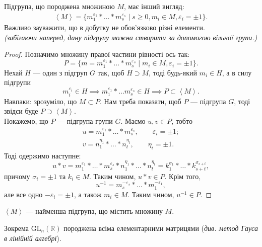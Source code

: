 \documentclass{math_library}
\begin{document}
\begin{proposition}
Підгрупа, що породжена множиною $M$, має інший вигляд:
\begin{align*}
\left<M\right> = \{ m_1^{\varepsilon_1} * \dots * m_s^{\varepsilon_s} \mid s \geq 0, m_i \in M, \varepsilon_i = \pm 1 \}.
\end{align*}
Важливо зауважити, що в добутку не обов'язково різні елементи.\\
\textit{(забігаючи наперед, дану підгрупу можна створити за допомогою вільної групи.)}
\end{proposition}

\begin{proof}
Позначимо множину правої частини рівності ось так:
\[ 
P = \{ m = m_1^{\varepsilon_1} * \dots * m_s^{\varepsilon_s} \mid m_i \in M, \varepsilon_i = \pm 1 \}.
\]
Нехай $H$ --- один з підгруп $G$ так, щоб $H \supset M$, тоді будь-який $m_i \in H$, а в силу підгрупи 
\[
m_i^{\varepsilon_i} \in H \implies m_1^{\varepsilon_1} * \dots m_s^{\varepsilon_s} \in H \implies P \subset \left<M\right>.
\]
Навпаки: зрозуміло, що $M \subset P$. Нам треба показати, щоб $P$ --- підгрупа $G$, тоді звідси буде $P \supset \left<M\right>$.
\bigskip \\
Покажемо, що $P$ --- підгрупа групи $G$. Маємо $u,v \in P$, тобто
\begin{align*}
u = m_1^{\varepsilon_1} * \dots * m_s^{\varepsilon_s}, \qquad \varepsilon_i = \pm 1; \\
v = n_1^{\eta_1} * \dots * n_t^{\eta_t}, \qquad \eta_i = \pm 1.
\end{align*}
Тоді одержимо наступне:
\[
u*v = m_1^{\varepsilon_1} * \dots * m_s^{\varepsilon_s} * n_1^{\eta_1} * \dots * n_t^{\eta_t} = k_1^{\sigma_1} * \dots * k_{s+t}^{\sigma_{s+t}},
\]
причому $\sigma_i = \pm 1$ та $k_i \in M$. Таким чином, $u*v \in P$. Крім того,
\[
u^{-1} = m_s^{-\varepsilon_s} * \dots * m_1^{-\varepsilon_1},
\]
але все одно $-\varepsilon_i = \pm 1$, а також $m_i \in M$. Таким чином, $u^{-1} \in P$.
\end{proof}

\begin{remark}
$\left<M\right>$ --- найменша підгрупа, що містить множину $M$.
\end{remark}

\begin{example}
Зокрема $\mathrm{GL}_n(\mathbb{R})$ породжена всіма елементарними матрицями (\textit{див. метод Гауса в лінійній алгебрі}).
\end{example}
\end{document}
